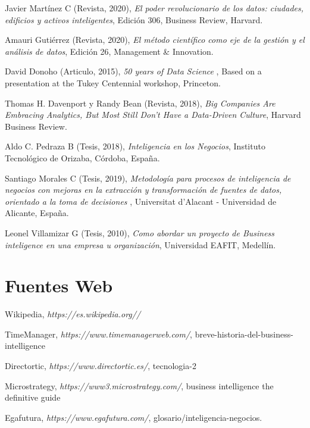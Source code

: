 \documentclass[11pt,titlepage]{report}
\begin{document}
\begin{thebibliography}{12}
 Javier Martínez C (Revista, 2020), \textit{El poder revolucionario de los datos: ciudades, edificios y activos inteligentes}, Edición 306, Business Review, Harvard.
	
 Amauri Gutiérrez (Revista, 2020), \textit{El método científico como eje de la gestión y el análisis de datos}, Edición 26, Management \& Innovation.
	
 David Donoho (Articulo, 2015), \textit{ 50 years of Data Science }, Based on a presentation at the Tukey Centennial workshop, Princeton.
	
 Thomas H. Davenport y Randy Bean (Revista, 2018), \textit{ Big Companies Are Embracing Analytics, But Most Still Don’t Have a Data-Driven Culture}, Harvard Business Review.
	
 Aldo C. Pedraza B (Tesis, 2018), \textit{ Inteligencia en los Negocios}, Instituto Tecnológico de Orizaba, Córdoba, España.
	
  Santiago Morales C (Tesis, 2019), \textit{ Metodología para procesos de inteligencia de negocios con mejoras en la extracción y transformación de fuentes de datos, orientado a la toma de decisiones }, Universitat d'Alacant - Universidad de Alicante, España.
	
  Leonel Villamizar G (Tesis, 2010), \textit{ Como abordar un proyecto de Business inteligence en una empresa u organización}, Universidad EAFIT, Medellín.
	

\section{Fuentes Web}

 Wikipedia, \textit{ https://es.wikipedia.org//}
	
 TimeManager, \textit{https://www.timemanagerweb.com/}, breve-historia-del-business-intelligence
	
 Directortic, \textit{ https://www.directortic.es/}, tecnologia-2
	
 Microstrategy, \textit{ https://www3.microstrategy.com/}, business intelligence the definitive guide
	
 Egafutura, \textit{ https://www.egafutura.com/}, glosario/inteligencia-negocios.
	

\end{thebibliography}
\end{document}
